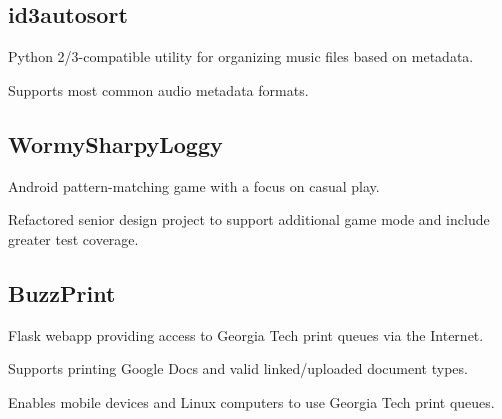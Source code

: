 \documentclass[]{deedy-resume-openfont}
\begin{document}
\begin{minipage}[t]{0.64\textwidth}
\subsection{id3autosort}
\vspace{\topsep} %
\begin{tightemize}
\item Python 2/3-compatible utility for organizing music files based on metadata.
\item Supports most common audio metadata formats.
\end{tightemize}
\sectionsep

\subsection{WormySharpyLoggy}
\vspace{\topsep} %
\begin{tightemize}
\item Android pattern-matching game with a focus on casual play.
\item Refactored senior design project to support additional game mode and include greater test coverage.
\end{tightemize}
\sectionsep

\subsection{BuzzPrint}
\vspace{\topsep} %
\begin{tightemize}
\item Flask webapp providing access to Georgia Tech print queues via the Internet.
\item Supports printing Google Docs and valid linked/uploaded document types.
\item Enables mobile devices and Linux computers to use Georgia Tech print queues.
\end{tightemize}
\sectionsep

\end{minipage} 
\end{document}
